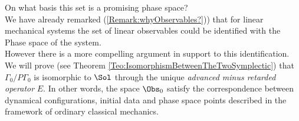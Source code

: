\documentclass[Main]{subfiles}
\begin{document}
		\begin{remark}
		On what basis this set is a promising phase space?\\
		We have already remarked (\ref{Remark:whyObservables?})) that for linear mechanical systems the set of linear observables could be identified with the Phase space of the system.
		\\
		However there is a more compelling argument in support to this identification. We will prove (see Theorem \ref{Teo:IsomorphismBetweenTheTwoSymplectic}) that $\Gamma_0 / P \Gamma_0$ is isomorphic to $\Sol$ through the unique \emph{advanced minus retarded operator} $E$.
		In other words, the space $\Obs_0$  satisfy the correspondence between dynamical configurations, initial data and phase space points described in the framework of ordinary classical mechanics.
		
		
		\end{remark}
\end{document}
